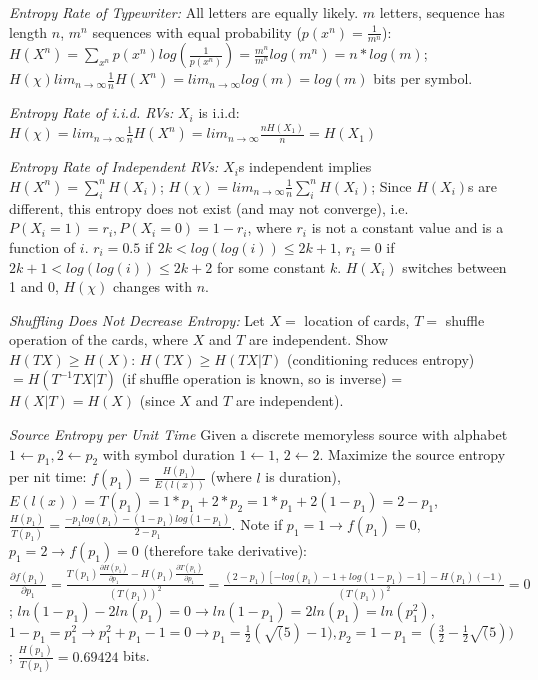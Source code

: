 \documentclass[10pt]{article}
\begin{document}
\begin{tiny}
\begin{multicols}{3}
\textit{Entropy Rate of Typewriter:} 
All letters are equally likely. 
$m$ letters, sequence has length $n$, 
$m^n$ sequences with equal probability ($p(x^n) = \frac{1}{m^n}$): 
$H(X^n) = \sum_{x^n} p(x^n) log(\frac{1}{p(x^n)}) =  \frac{m^n}{m^n}log(m^n) = n*log(m)$; $H(\chi) lim_{n \to \infty} \frac{1}{n} H(X^n) = lim_{n \to \infty} log(m) = log(m)$ bits per symbol.

\textit{Entropy Rate of i.i.d. RVs:} 
$X_i$ is i.i.d: 
$H(\chi) = lim_{n \to \infty} \frac{1}{n} H(X^n) = lim_{n \to \infty} \frac{nH(X_1)}{n} = H(X_1)$

\textit{Entropy Rate of Independent RVs:} 
$X_i$s independent implies $H(X^n) = \sum_i^n H(X_i)$; 
$H(\chi) = lim_{n \to \infty} \frac{1}{n} \sum_i^n H(X_i) $; 
Since $H(X_i)$s are different, 
this entropy does not exist (and may not converge), 
i.e. $P(X_i = 1) = r_i, P(X_i = 0) = 1 - r_i$, 
where $r_i$ is not a constant value and is a function of $i$. 
$r_i = 0.5$ if $2k < log(log(i)) \leq 2k + 1$, $r_i = 0$ if $2k + 1 < log(log(i)) \leq 2k +2 $ for some constant $k$. $H(X_i)$ switches between 1 and 0, $H(\chi)$ changes with $n$.

\textit{Shuffling Does Not Decrease Entropy:} 
Let $X =$ location of cards, $T =$ shuffle operation of the cards, 
where $X$ and $T$ are independent. Show $H(TX) \geq H(X)$: $H(TX) \geq H(TX|T)$ (conditioning reduces entropy) $= H(T^{-1}TX|T)$ (if shuffle operation is known, so is inverse) = $H(X|T) = H(X)$ (since $X$ and $T$ are independent).

\textit{Source Entropy per Unit Time} 
Given a discrete memoryless source with alphabet $1 \gets p_1, 2 \gets p_2$ with symbol duration $1 \gets 1$, $2 \gets 2$. 
Maximize the source entropy per nit time: $f(p_1) = \frac{H(p_1)}{E(l(x))}$ (where $l$ is duration), $E(l(x)) = T(p_1) = 1*p_1 + 2*p_2 = 1*p_1 + 2(1-p_1) = 2 - p_1$, $\frac{H(p_1)}{T(p_1)} = \frac{-p_1 log(p_1) - (1-p_1)log(1-p_1)}{2-p_1}$. Note if $p_1 = 1 \to f(p_1) = 0$, $p_1 = 2 \to f(p_1) = 0$ 
(therefore take derivative): $\frac{\partial f(p_1)}{\partial p_1} = \frac{ T(p_1)\frac{\partial H(p_1)}{\partial p_1} - H(p_1)\frac{\partial T(p_1)}{\partial p_1}}{(T(p_1))^2} = \frac{(2-p_1)[-log(p_1) -1 + log(1-p_1) - 1] - H(p_1)(-1)}{(T(p_1))^2}=0$; $ln(1-p_1) - 2ln(p_1) = 0 \to ln(1-p_1) = 2ln(p_1) = ln(p_1^2)$, $1-p_1 = p_1^2 \to p_1^2 + p_1 - 1 = 0 \to p_1 = \frac{1}{2}(\sqrt(5) - 1), p_2 = 1 - p_1 = (\frac{3}{2} - \frac{1}{2}\sqrt(5))$; $\frac{H(p_1)}{T(p_1)} = 0.69424$ bits. 


\end{multicols}
\end{tiny}
\end{document}
